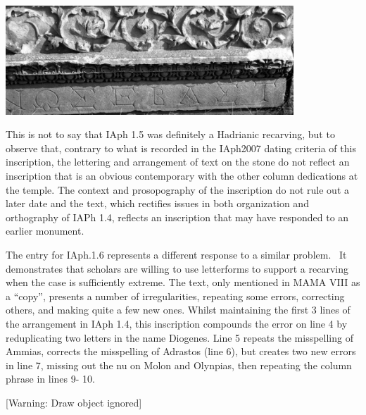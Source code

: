 \documentclass[amsthm,ebook]{saparticle}
\begin{document}
\bigskip


\bigskip

 \includegraphics[width=10.836cm,height=4.092cm]{PaperproposalforEAGLEfinal-img004.jpg} 


\bigskip

This is not to say that IAph 1.5 was definitely a Hadrianic recarving, but to observe that, contrary to what is recorded
in the IAph2007 dating criteria of this inscription, the lettering and arrangement of text on the stone do not reflect
an inscription that is an obvious contemporary with the other column dedications at the temple. The context and
prosopography of the inscription do not rule out a later date and the text, which rectifies issues in both organization
and orthography of IAPh 1.4, reflects an inscription that may have responded to an earlier monument. 

The entry for IAph.1.6 represents a different response to a similar problem. \ It demonstrates that scholars are willing
to use letterforms to support a recarving when the case is sufficiently extreme. The text, only mentioned in MAMA VIII
as a “copy”, presents a number of irregularities, repeating some errors, correcting others, and making quite a few new
ones. Whilst maintaining the first 3 lines of the arrangement in IAph 1.4, this inscription compounds the error on line
4 by reduplicating two letters in the name Diogenes. Line 5 repeats the misspelling of Ammias, corrects the misspelling
of Adrastos (line 6), but creates two new errors in line 7, missing out the nu on Molon and Olynpias, then repeating
the column phrase in lines 9- 10. 


\bigskip

[Warning: Draw object ignored]


\bigskip


\bigskip


\bigskip


\bigskip


\bigskip


\bigskip


\bigskip


\bigskip
\end{document}
